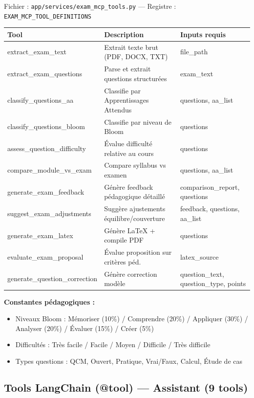 \documentclass[12pt,a4paper]{article}
\begin{document}
Fichier : \texttt{app/services/exam\_mcp\_tools.py} --- Registre : \texttt{EXAM\_MCP\_TOOL\_DEFINITIONS}

\begin{longtable}{lp{6.5cm}l}
\toprule
\textbf{Tool} & \textbf{Description} & \textbf{Inputs requis} \\
\midrule
extract\_exam\_text & Extrait texte brut (PDF, DOCX, TXT) & file\_path \\
extract\_exam\_questions & Parse et extrait questions structurées & exam\_text \\
classify\_questions\_aa & Classifie par Apprentissages Attendus & questions, aa\_list \\
classify\_questions\_bloom & Classifie par niveau de Bloom & questions \\
assess\_question\_difficulty & Évalue difficulté relative au cours & questions \\
compare\_module\_vs\_exam & Compare syllabus vs examen & questions, aa\_list \\
generate\_exam\_feedback & Génère feedback pédagogique détaillé & comparison\_report, questions \\
suggest\_exam\_adjustments & Suggère ajustements équilibre/couverture & feedback, questions, aa\_list \\
generate\_exam\_latex & Génère \LaTeX{} + compile PDF & questions \\
evaluate\_exam\_proposal & Évalue proposition sur critères péd. & latex\_source \\
generate\_question\_correction & Génère correction modèle & question\_text, question\_type, points \\
\bottomrule
\end{longtable}

\textbf{Constantes pédagogiques :}
\begin{itemize}[noitemsep]
  \item Niveaux Bloom : Mémoriser (10\%) / Comprendre (20\%) / Appliquer (30\%) / Analyser (20\%) / Évaluer (15\%) / Créer (5\%)
  \item Difficultés : Très facile / Facile / Moyen / Difficile / Très difficile
  \item Types questions : QCM, Ouvert, Pratique, Vrai/Faux, Calcul, Étude de cas
\end{itemize}

\subsection{Tools LangChain (@tool) --- Assistant (9 tools)}
\end{document}
